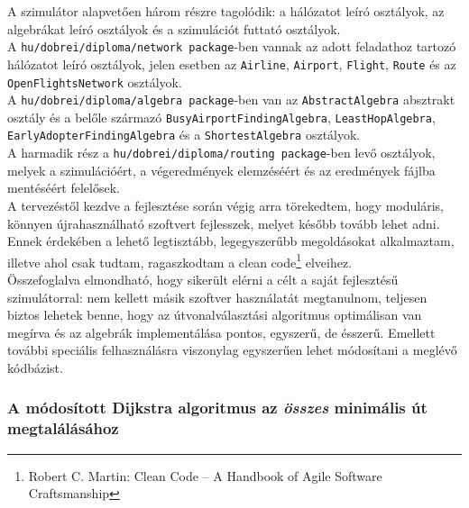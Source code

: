   A szimulátor alapvetően három részre tagolódik: a hálózatot leíró osztályok, az algebrákat leíró osztályok és a szimulációt futtató osztályok.\\

  A \texttt{hu/dobrei/diploma/network package}-ben vannak az adott feladathoz tartozó hálózatot leíró osztályok, jelen esetben az \texttt{Airline}, \texttt{Airport}, \texttt{Flight}, \texttt{Route} és az \texttt{OpenFlightsNetwork} osztályok.\\

  A \texttt{hu/dobrei/diploma/algebra package}-ben van az \texttt{AbstractAlgebra} absztrakt osztály és a belőle származó \texttt{BusyAirportFindingAlgebra}, \texttt{LeastHopAlgebra}, \texttt{EarlyAdopterFindingAlgebra} és a \texttt{ShortestAlgebra} osztályok.\\

  A harmadik rész a \texttt{hu/dobrei/diploma/routing package}-ben levő osztályok, melyek a szimulációért, a végeredmények elemzéséért és az eredmények fájlba mentéséért felelősek.\\

  A tervezéstől kezdve a fejlesztése során végig arra törekedtem, hogy moduláris, könnyen újrahasználható szoftvert fejlesszek, melyet később tovább lehet adni. Ennek érdekében a lehető legtisztább, legegyszerűbb megoldásokat alkalmaztam, illetve ahol csak tudtam, ragaszkodtam a clean code\footnote{Robert C. Martin: Clean Code -- A Handbook of Agile Software Craftsmanship} elveihez.\\

  Összefoglalva elmondható, hogy sikerült elérni a célt a saját fejlesztésű szimulátorral: nem kellett másik szoftver használatát megtanulnom, teljesen biztos lehetek benne, hogy az útvonalválasztási algoritmus optimálisan van megírva és az algebrák implementálása pontos, egyszerű, de ésszerű. Emellett további speciális felhasználásra viszonylag egyszerűen lehet módosítani a meglévő kódbázist.

    \subsubsection{A módosított Dijkstra algoritmus az \textit{összes} minimális út megtalálásához}\label{dijkstra}
